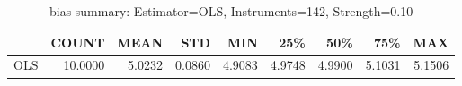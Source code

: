 \begin{table}[ht]
\centering
\caption{bias summary: Estimator=OLS, Instruments=142, Strength=0.10}
\begin{tabular}{lrrrrrrrr}
\toprule
 & COUNT & MEAN & STD & MIN & 25\% & 50\% & 75\% & MAX \\
\midrule
OLS & 10.0000 & 5.0232 & 0.0860 & 4.9083 & 4.9748 & 4.9900 & 5.1031 & 5.1506 \\
\bottomrule
\end{tabular}
\end{table}
